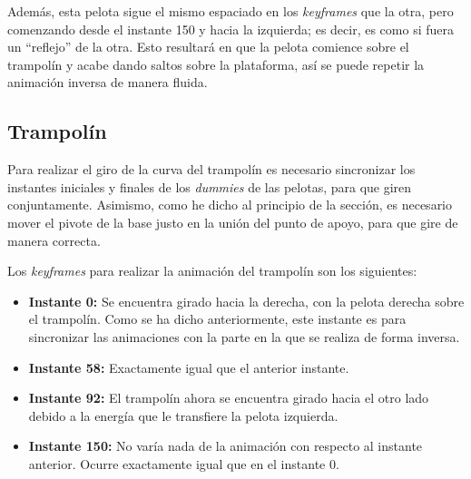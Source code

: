 \bigskip

Además, esta pelota sigue el mismo espaciado en los \textit{keyframes} que la otra, pero comenzando desde el instante 150 y hacia la izquierda; es decir, es como si fuera un ``reflejo'' de la otra. Esto resultará en que la pelota comience sobre el trampolín y acabe dando saltos sobre la plataforma, así se puede repetir la animación inversa de manera fluida.

\bigskip



\newpage
\subsection{Trampolín}
Para realizar el giro de la curva del trampolín es necesario sincronizar los instantes iniciales y finales de los \textit{dummies} de las pelotas, para que giren conjuntamente. Asimismo, como he dicho al principio de la sección, es necesario mover el pivote de la base justo en la unión del punto de apoyo, para que gire de manera correcta.

\bigskip

Los \textit{keyframes} para realizar la animación del trampolín son los siguientes:

\begin{itemize}
    \item \textbf{Instante 0: }Se encuentra girado hacia la derecha, con la pelota derecha sobre el trampolín. Como se ha dicho anteriormente, este instante es para sincronizar las animaciones con la parte en la que se realiza de forma inversa.
    \item \textbf{Instante 58: }Exactamente igual que el anterior instante.
    \item \textbf{Instante 92: }El trampolín ahora se encuentra girado hacia el otro lado debido a la energía que le transfiere la pelota izquierda.
    \item \textbf{Instante 150: }No varía nada de la animación con respecto al instante anterior. Ocurre exactamente igual que en el instante 0.
\end{itemize}

\bigskip

